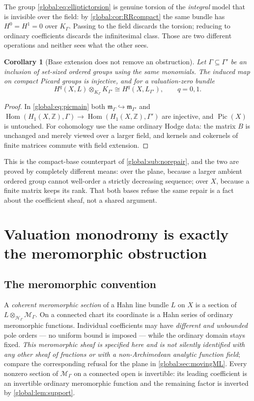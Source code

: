 \documentclass[11pt,letterpaper]{article}
\newtheorem{corollary}[corollary]{Corollary}
\theoremstyle{definition}
\theoremstyle{remark}
\newcommand{\Z}{\mathbb Z}
\newcommand{\HH}{\mathscr H_\Gamma}
\newcommand{\KK}{K_\Gamma}
\newcommand{\mK}{\mathfrak m_\Gamma}
\newcommand{\Pic}{\operatorname{Pic}}
\newcommand{\MG}{\mathscr M_\Gamma}
\newcommand{\Hom}{\operatorname{Hom}}
\numberwithin{equation}{section}
\begin{document}
The group \eqref{global:eq:elliptictorsion} is genuine torsion of the \emph{integral} model that is invisible over the field: by \cref{global:cor:RRcompact} the same bundle has $H^0=H^1=0$ over $\KK$. Passing to the field discards the torsion; reducing to ordinary coefficients discards the infinitesimal class. Those are two different operations and neither sees what the other sees.

\begin{corollary}[Base extension does not remove an obstruction]\label{global:cor:baseext}
Let $\Gamma\subseteq\Gamma'$ be an inclusion of set-sized ordered groups using the same monomials. The induced map on compact Picard groups is injective, and for a valuation-zero bundle
\[
  H^q(X,L)\otimes_{\KK}K_{\Gamma'}\cong H^q(X,L_{\Gamma'}),\qquad q=0,1 .
\]
\end{corollary}

\begin{proof}
In \eqref{global:eq:picmain} both $\mK\hookrightarrow\mathfrak m_{\Gamma'}$ and $\Hom(H_1(X,\Z),\Gamma)\to\Hom(H_1(X,\Z),\Gamma')$ are injective, and $\Pic(X)$ is untouched. For cohomology use the same ordinary Hodge data: the matrix $B$ is unchanged and merely viewed over a larger field, and kernels and cokernels of finite matrices commute with field extension.
\end{proof}

This is the compact-base counterpart of \cref{global:sub:norepair}, and the two are proved by completely different means: over the plane, because a larger ambient ordered group cannot well-order a strictly decreasing sequence; over $X$, because a finite matrix keeps its rank. That both bases refuse the same repair is a fact about the coefficient sheaf, not a shared argument.

\section{Valuation monodromy is exactly the meromorphic obstruction}\label{global:sec:meromorphic}

\subsection{The meromorphic convention}

A \emph{coherent meromorphic section} of a Hahn line bundle $L$ on $X$ is a section of $L\otimes_{\HH}\MG$. On a connected chart its coordinate is a Hahn series of ordinary meromorphic functions. Individual coefficients may have \emph{different and unbounded} pole orders --- no uniform bound is imposed --- while the ordinary domain stays fixed. \emph{This meromorphic sheaf is specified here and is not silently identified with any other sheaf of fractions or with a non-Archimedean analytic function field}; compare the corresponding refusal for the plane in \cref{global:sec:movingML}. Every nonzero section of $\MG$ on a connected open is invertible: its leading coefficient is an invertible ordinary meromorphic function and the remaining factor is inverted by \cref{global:lem:support}.
\end{document}
